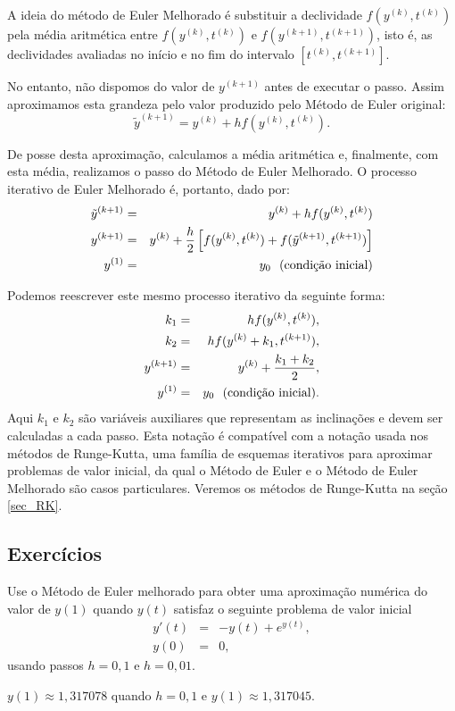 A ideia do método de Euler Melhorado é substituir a declividade  $f(y^{(k)},t^{(k)})$ pela média aritmética entre $f(y^{(k)},t^{(k)})$ e $f(y^{(k+1)},t^{(k+1)})$, isto é, as declividades avaliadas no início e no fim do intervalo $[t^{(k)},t^{(k+1)}]$.

No entanto, não dispomos do valor de $y^{(k+1)}$ antes de executar o passo. Assim aproximamos esta grandeza pelo valor produzido pelo Método de Euler original:
$$\tilde{y}^{(k+1)}=y^{(k)}+hf(y^{(k)},t^{(k)}).$$

De posse desta aproximação, calculamos a média aritmética e, finalmente, com esta média, realizamos o passo do Método de Euler Melhorado. O processo iterativo de Euler Melhorado é, portanto, dado por:
\begin{eqnarray*}
\tilde{y}^{(k+1)}&=&y^{(k)}+hf(y^{(k)},t^{(k)})\\
y^{(k+1)}&=&y^{(k)}+\frac{h}{2}\left[f(y^{(k)},t^{(k)})+f(\tilde{y}^{(k+1)},t^{(k+1)})\right]\\
y^{(1)}&=&y_0~~ \hbox{(condição inicial)}
\end{eqnarray*}

Podemos reescrever este mesmo processo iterativo da seguinte forma:
\begin{eqnarray*}
k_1&=&hf(y^{(k)},t^{(k)}),\\
k_2&=&hf(y^{(k)}+k_1,t^{(k+1)}),\\
y^{(k+1)}&=&y^{(k)}+\frac{k_1+k_2}{2},\\
y^{(1)}&=&y_0~~ \hbox{(condição inicial)}.
\end{eqnarray*}
Aqui $k_1$ e $k_2$ são variáveis auxiliares que representam as inclinações e devem ser calculadas a cada passo. Esta notação é compatível com a notação usada nos métodos de Runge-Kutta, uma família de esquemas iterativos para aproximar problemas de valor inicial, da qual o Método de Euler e o Método de Euler Melhorado são casos particulares. Veremos os métodos de Runge-Kutta na seção \ref{sec_RK}.


\subsection*{Exercícios}

\begin{exer} Use o Método de Euler melhorado para obter uma aproximação numérica do valor de $y(1)$ quando $y(t)$ satisfaz o seguinte problema de valor inicial
\begin{eqnarray*}
 y'(t)&=&-y(t)+ e^{y(t)},\\
 y(0)&=&0,
\end{eqnarray*}
usando passos $h=0,1$ e $h=0,01$.
\end{exer}
\begin{resp}
  
 $y(1)\approx 1,317078$ quando $h=0,1$ e $y(1)\approx 1,317045$.    
  
\end{resp}


